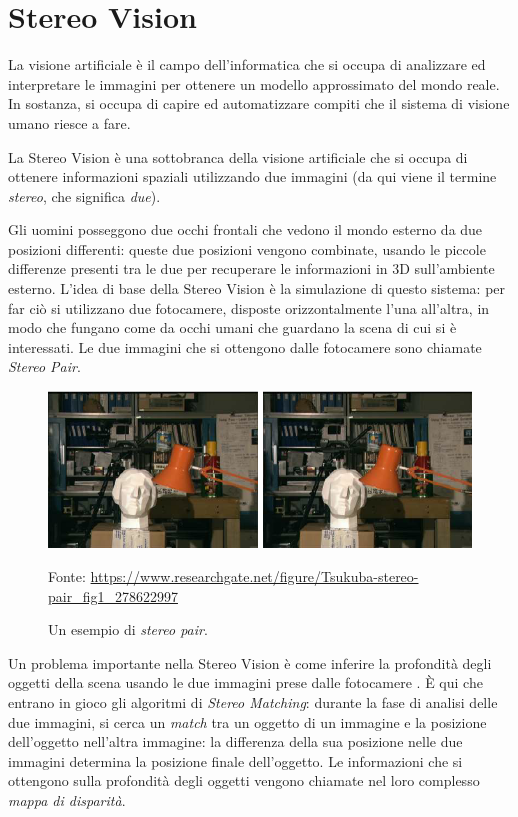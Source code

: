 \documentclass[12pt,a4paper,openright,twoside]{report}
\newcommand{\source}[1]{\caption*{\hfill \scriptsize Fonte: {#1}} }
\begin{document}
\chapter{Stereo Vision}

La visione artificiale è il campo dell'informatica che si occupa di analizzare ed interpretare le immagini per ottenere un modello approssimato del mondo reale. In sostanza, si occupa di capire ed automatizzare compiti che il sistema di visione umano riesce a fare.

La Stereo Vision è una sottobranca della visione artificiale che si occupa di ottenere informazioni spaziali utilizzando due immagini (da qui viene il termine \textit{stereo}, che significa \textit{due}).

Gli uomini posseggono due occhi frontali che vedono il mondo esterno da due posizioni differenti: queste due posizioni vengono combinate, usando le piccole differenze presenti tra le due per recuperare le informazioni in 3D sull'ambiente esterno. L'idea di base della Stereo Vision è la simulazione di questo sistema: per far ciò si utilizzano due fotocamere, disposte orizzontalmente l'una all'altra, in modo che fungano come da occhi umani che guardano la scena di cui si è interessati. Le due immagini che si ottengono dalle fotocamere sono chiamate \textit{Stereo Pair}.

\begin{figure}[h]
    \centering
    \includegraphics[width=\textwidth]{tsukuba-stereo-pair.png}
    \source{\url{https://www.researchgate.net/figure/Tsukuba-stereo-pair_fig1_278622997}}
    \caption{Un esempio di \textit{stereo pair}.}
    \label{img:stereo_pair}
\end{figure}

Un problema importante nella Stereo Vision è come inferire la profondità degli oggetti della scena usando le due immagini prese dalle fotocamere \cite{imagevideohandbook}. È qui che entrano in gioco gli algoritmi di \textit{Stereo Matching}: durante la fase di analisi delle due immagini, si cerca un \textit{match} tra un oggetto di un immagine e la posizione dell'oggetto nell'altra immagine: la differenza della sua posizione nelle due immagini determina la posizione finale dell'oggetto. Le informazioni che si ottengono sulla profondità degli oggetti vengono chiamate nel loro complesso \textit{mappa di disparità}.
\end{document}
